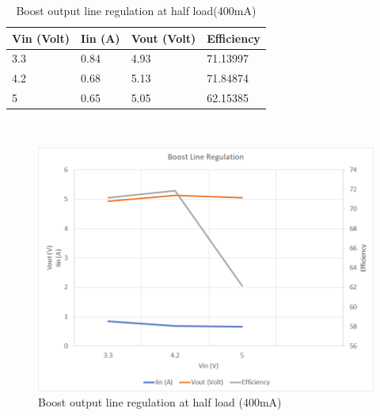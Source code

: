 \begin{table}[H]
\centering
\begin{tabular}{|l|l|l|l|}
\hline
Vin (Volt) & Iin (A) & Vout (Volt) & Efficiency \\ \hline
3.3        & 0.84    & 4.93        & 71.13997   \\ \hline
4.2        & 0.68    & 5.13        & 71.84874   \\ \hline
5          & 0.65    & 5.05        & 62.15385   \\ \hline
\end{tabular}
\caption{Boost output line regulation at half load(400mA)}
\label{table:4}
\end{table}
\\
\begin{figure}[H]
	\centering
	\includegraphics[width=\columnwidth]{IMGS/Boost output line regulation at half load (400mA).png}
	\caption{Boost output line regulation at half load (400mA)}
	\label{fig:arch}
\end{figure}
\pagebreak
